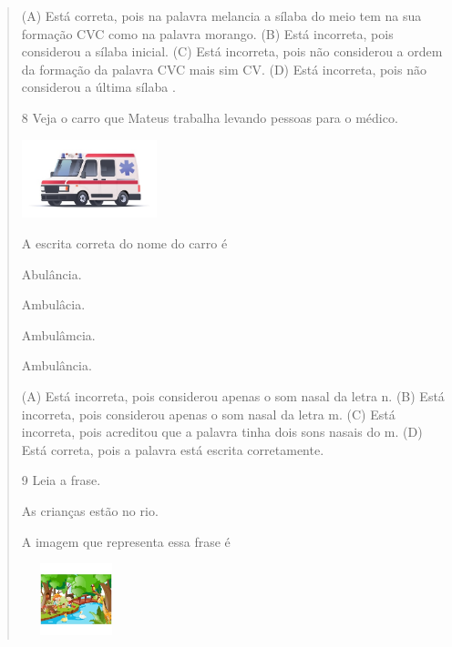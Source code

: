 \begin{verse}
(A) Está correta, pois na palavra melancia a sílaba do meio tem na sua
formação CVC como na palavra morango.
(B) Está incorreta, pois considerou a sílaba inicial.
(C) Está incorreta, pois não considerou a ordem da formação da palavra
CVC mais sim CV.
(D) Está incorreta, pois não considerou a última sílaba .

\num{8} Veja o carro que Mateus trabalha levando pessoas para o médico.

\includegraphics[width=1.54514in,height=0.89444in]{media/image153.jpeg}


A escrita correta do nome do carro é

\begin{minipage}{.5\textwidth}
\begin{escolha}
\item Abulância.

\item Ambulâcia.

\item Ambulâmcia.

\item Ambulância.
\end{escolha}
\end{minipage}

(A) Está incorreta, pois considerou apenas o som nasal da letra n.
(B) Está incorreta, pois considerou apenas o som nasal da letra m.
(C) Está incorreta, pois acreditou que a palavra tinha dois sons nasais do m.
(D) Está correta, pois a palavra está escrita corretamente.

\num{9} Leia a frase.

As crianças estão no rio.

A imagem que representa essa frase é

\begin{escolha}
\item \includegraphics[width=1.25000in,height=0.82361in]{media/image154.jpeg}


\end{escolha}
\end{verse}

